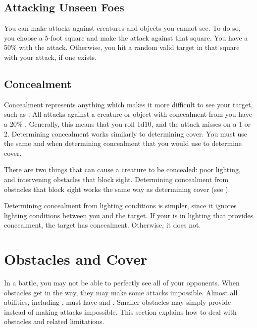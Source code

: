     \subsection{Attacking Unseen Foes}
        You can make  attacks against creatures and objects you cannot see.
        To do so, you choose a 5-foot square and make the attack against that square.
        You have a 50\%  with the attack.
        Otherwise, you hit a random valid target in that square with your attack, if one exists.

    \subsection{Concealment}\label{Concealment}
        Concealment represents anything which makes it more difficult to see your target, such as .
        All  attacks against a creature or object with concealment from you have a 20\% .
        Generally, this means that you roll 1d10, and the attack misses on a 1 or 2.
        Determining concealment works similarly to determining cover.
        You must use the same  and  when determining concealment that you would use to determine cover.

         There are two things that can cause a creature to be concealed: poor lighting, and intervening obstacles that block sight.
        Determining concealment from obstacles that block sight works the same way as determining cover (see ).

        Determining concealment from lighting conditions is simpler, since it ignores lighting conditions between you and the target.
        If your  is in lighting that provides concealment, the target has concealment.
        Otherwise, it does not.

\section{Obstacles and Cover}\label{Obstacles and Cover}
    In a battle, you may not be able to perfectly see all of your opponents.
    When obstacles get in the way, they may make some attacks impossible.
    Almost all abilities, including , must have  and .
    Smaller obstacles may simply provide  instead of making attacks impossible.
    This section explains how to deal with obstacles and related limitations.

